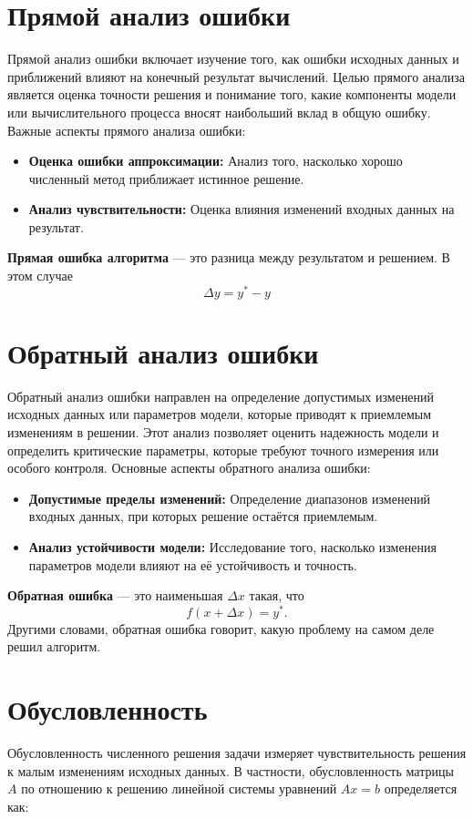 \documentclass{article}
\begin{document}
\section{Прямой анализ ошибки}
Прямой анализ ошибки включает изучение того, как ошибки исходных данных и приближений влияют на конечный результат вычислений. Целью прямого анализа является оценка точности решения и понимание того, какие компоненты модели или вычислительного процесса вносят наибольший вклад в общую ошибку. Важные аспекты прямого анализа ошибки:
\begin{itemize}
    \item \textbf{Оценка ошибки аппроксимации:} Анализ того, насколько хорошо численный метод приближает истинное решение.
    \item \textbf{Анализ чувствительности:} Оценка влияния изменений входных данных на результат.
\end{itemize}
\textbf{Прямая ошибка алгоритма} — это разница между результатом и решением. В этом случае 
$$\Delta y = y^* - y$$
\section{Обратный анализ ошибки}
Обратный анализ ошибки направлен на определение допустимых изменений исходных данных или параметров модели, которые приводят к приемлемым изменениям в решении. Этот анализ позволяет оценить надежность модели и определить критические параметры, которые требуют точного измерения или особого контроля. Основные аспекты обратного анализа ошибки:
\begin{itemize}
    \item \textbf{Допустимые пределы изменений:} Определение диапазонов изменений входных данных, при которых решение остаётся приемлемым.
    \item \textbf{Анализ устойчивости модели:} Исследование того, насколько изменения параметров модели влияют на её устойчивость и точность.
\end{itemize}
\textbf{Обратная ошибка} — это наименьшая $\Delta x$ такая, что $$f(x + \Delta x) = y^*.$$ Другими словами, обратная ошибка говорит, какую проблему на самом деле решил алгоритм.
\section{Обусловленность}
Обусловленность численного решения задачи измеряет чувствительность решения к малым изменениям исходных данных. В частности, обусловленность матрицы \(A\) по отношению к решению линейной системы уравнений \(Ax = b\) определяется как:
\end{document}
